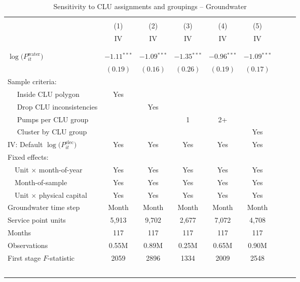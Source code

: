 \begin{table}[t!]\centering
\small
\caption{Sensitivity to CLU assignments and groupings -- Groundwater  \label{tab:water_clu_sensitivities}}
\vspace{-0.1cm}
\small
\begin{adjustbox}{center} 
\begin{tabular}{lcccccccc} 
\hline \hline
\vspace{-0.37cm}
\\
 & (1)  & (2)  & (3)  & (4)  & (5)  \\ 
[0.1em]
 & IV & IV & IV & IV & IV \\
\vspace{-0.37cm}
\\
\cline{2-6}
\vspace{-0.27cm}
\\
 $\log\big(P^{\text{water}}_{it}\big)$ ~ & 
 $-1.11$$^{***}$  & $-1.09$$^{***}$ & $-1.35$$^{***}$ & $-0.96$$^{***}$ & $-1.09$$^{***}$ \\ 
& $(0.19)$ & $(0.16)$ & $(0.26)$ & $(0.19)$ & $(0.17)$  \\
[1.5em] 
Sample criteria: \\
[0.1em] 
~~ Inside CLU polygon  & Yes & & & & \\
[0.1em] 
~~ Drop CLU inconsistencies  & & Yes & & & \\
[0.1em] 
~~ Pumps per CLU group  & &  & 1 & 2+ & \\
[0.1em] 
~~ Cluster by CLU group  & &  &  &  & Yes \\
[1em] 
IV: Default $\log\big(P^{\text{elec}}_{it}\big)$  & Yes & Yes & Yes  & Yes  & Yes  \\
[1em] 
Fixed effects: \\
[0.1em] 
~~Unit $\times$ month-of-year  & Yes  & Yes  & Yes   & Yes  & Yes   \\ 
[0.1em] 
~~Month-of-sample  & Yes  & Yes  & Yes  & Yes  & Yes    \\ 
[0.1em] 
~~Unit $\times$ physical capital & Yes & Yes & Yes & Yes & Yes  \\
[1em] 
Groundwater time step & Month & Month & Month & Month & Month  \\ 
[1em] 
Service point units & 5,913 & 9,702 & 2,677 & 7,072 & 4,708  \\ 
[0.1em] 
Months  & 117 & 117 & 117 & 117 & 117 \\ 
[0.1em] 
Observations & 0.55M & 0.89M & 0.25M & 0.65M & 0.90M  \\ 
[0.1em] 
First stage $F$-statistic & 2059 & 2896 & 1334 & 2009 & 2548  \\ 
$$
\end{tabular}
\end{adjustbox}
\end{table}
